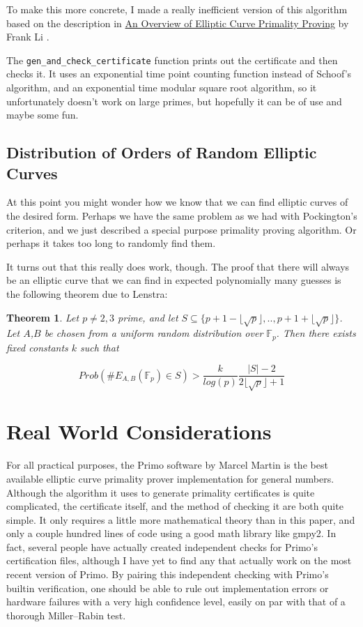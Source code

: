 \documentclass[]{article}
\newtheorem{theorem}{Theorem}
\newcommand{\F}{\mathbb{F}}
\newcommand{\floor}[1]{\lfloor #1 \rfloor}
\begin{document}
To make this more concrete, I made a really inefficient version of this algorithm based on the description in \underline{An Overview of Elliptic Curve Primality Proving} by Frank Li \cite{StanfordAlgo}.

The \texttt{gen\_and\_check\_certificate} function prints out the certificate and then checks it. It uses an exponential time point counting function instead of Schoof's algorithm, and an exponential time modular square root algorithm, so it unfortunately doesn't work on large primes, but hopefully it can be of use and maybe some fun.


\subsection{Distribution of Orders of Random Elliptic Curves}


At this point you might wonder how we know that we can find elliptic curves of the desired form. Perhaps we have the same problem as we had with Pockington's criterion, and we just described a special purpose primality proving algorithm. Or perhaps it takes too long to randomly find them.

It turns out that this really does work, though. The proof that there will always be an elliptic curve that we can find in expected polynomially many guesses is the following theorem due to Lenstra:

\begin{theorem}
Let $p \ne 2,3$ prime, and let $S \subseteq \{p+1 - \floor{\sqrt{p}},.., p+1 + \floor{\sqrt{p}}\}$. Let $A$,$B$ be  chosen from a uniform random distribution over $\F_p$. Then there exists fixed constants $k$ such that

$$Prob(\# E_{A,B}(\F_p) \in S) > \frac{k}{log(p)} \frac{|S|-2}{2 \floor{\sqrt{p}}+1}$$
\end{theorem}

\section{Real World Considerations}

For all practical purposes, the Primo software by Marcel Martin is the best available elliptic curve primality prover implementation for general numbers. Although the algorithm it uses to generate primality certificates is quite complicated, the certificate itself, and the method of checking it are both quite simple. It only requires a little more mathematical theory than in this paper, and only a couple hundred lines of code using a good math library like gmpy2. In fact, several people have actually created independent checks for Primo's certification files, although I have yet to find any that actually work on the most recent version of Primo. By pairing this independent checking with Primo's builtin verification, one should be able to rule out implementation errors or hardware failures with a very high confidence level, easily on par with that of a thorough Miller--Rabin test.
\end{document}
